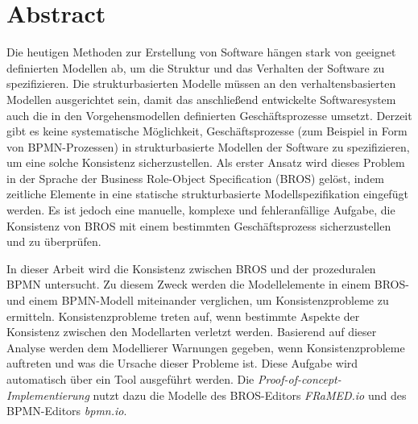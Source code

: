 \chapter*{Abstract}

Die heutigen Methoden zur Erstellung von Software hängen stark von geeignet definierten Modellen ab, um die Struktur und das Verhalten der Software zu spezifizieren.
Die strukturbasierten Modelle müssen an den verhaltensbasierten Modellen ausgerichtet sein, damit das anschließend entwickelte Softwaresystem auch die in den Vorgehensmodellen definierten Geschäftsprozesse umsetzt.
Derzeit gibt es keine systematische Möglichkeit, Geschäftsprozesse (zum Beispiel in Form von BPMN-Prozessen) in strukturbasierte Modellen der Software zu spezifizieren, um eine solche Konsistenz sicherzustellen.
Als erster Ansatz wird dieses Problem in der Sprache der Business Role-Object Specification (BROS) gelöst, indem zeitliche Elemente in eine statische strukturbasierte Modellspezifikation eingefügt werden.
Es ist jedoch eine manuelle, komplexe und fehleranfällige Aufgabe, die Konsistenz von BROS mit einem bestimmten Geschäftsprozess sicherzustellen und zu überprüfen.

In dieser Arbeit wird die Konsistenz zwischen BROS und der prozeduralen BPMN untersucht.
Zu diesem Zweck werden die Modellelemente in einem BROS- und einem BPMN-Modell miteinander verglichen, um Konsistenzprobleme zu ermitteln.
Konsistenzprobleme treten auf, wenn bestimmte Aspekte der Konsistenz zwischen den Modellarten verletzt werden.
Basierend auf dieser Analyse werden dem Modellierer Warnungen gegeben, wenn Konsistenzprobleme auftreten und was die Ursache dieser Probleme ist.
Diese Aufgabe wird automatisch über ein Tool ausgeführt werden. Die \emph{Proof-of-concept-Implementierung} nutzt dazu die Modelle des BROS-Editors \emph{FRaMED.io} und des BPMN-Editors \emph{bpmn.io}.
